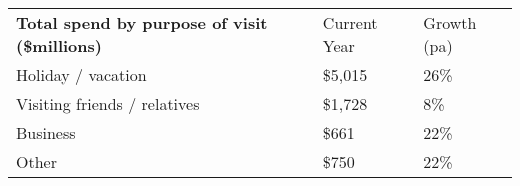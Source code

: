 \begin{tabular}[t]{p{4.85cm}>{\hfill}p{1.3cm}>{\hfill}p{1.35cm}}
 \textbf{Total spend by purpose of visit (\$millions)} & Current Year & Growth (pa) \\ 
 Holiday / vacation & \$5,015 & 26\% \\ 
  Visiting friends / relatives & \$1,728 & 8\% \\ 
  Business & \$661   & 22\% \\ 
  Other & \$750 & 22\% \\ 
  \end{tabular}
